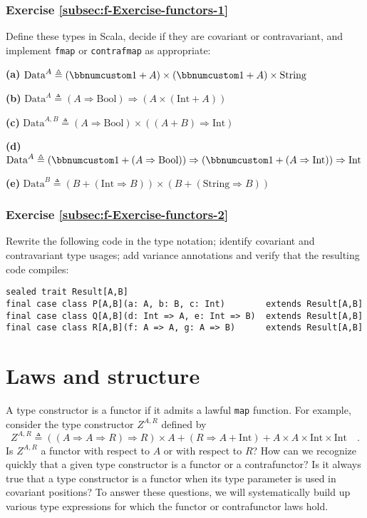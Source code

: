\subsubsection{Exercise \label{subsec:f-Exercise-functors-1}\ref{subsec:f-Exercise-functors-1}}

Define these types in Scala, decide if they are covariant or contravariant,
and implement \lstinline!fmap! or \lstinline!contrafmap! as appropriate:

\textbf{(a)} $\text{Data}^{A}\triangleq\left(\bbnum 1+A\right)\times\left(\bbnum 1+A\right)\times\text{String}$

\textbf{(b)} $\text{Data}^{A}\triangleq(A\Rightarrow\text{Bool})\Rightarrow\left(A\times\left(\text{Int}+A\right)\right)$

\textbf{(c)} $\text{Data}^{A,B}\triangleq(A\Rightarrow\text{Bool})\times\left((A+B)\Rightarrow\text{Int}\right)$

\textbf{(d)} $\text{Data}^{A}\triangleq(\bbnum 1+(A\Rightarrow\text{Bool}))\Rightarrow(\bbnum 1+(A\Rightarrow\text{Int}))\Rightarrow\text{Int}$

\textbf{(e)} $\text{Data}^{B}\triangleq(B+(\text{Int}\Rightarrow B))\times(B+(\text{String}\Rightarrow B))$

\subsubsection{Exercise \label{subsec:f-Exercise-functors-2}\ref{subsec:f-Exercise-functors-2}}

Rewrite the following code in the type notation; identify covariant
and contravariant type usages; add variance annotations and verify
that the resulting code compiles:

\begin{lstlisting}
sealed trait Result[A,B]
final case class P[A,B](a: A, b: B, c: Int)        extends Result[A,B]
final case class Q[A,B](d: Int => A, e: Int => B)  extends Result[A,B]
final case class R[A,B](f: A => A, g: A => B)      extends Result[A,B]
\end{lstlisting}


\section{Laws and structure\label{sec:f-Laws-and-structure}}

A type constructor is a functor if it admits a lawful \lstinline!map!
function. For example, consider the type constructor $Z^{A,R}$ defined
by 
\[
Z^{A,R}\triangleq\left(\left(A\Rightarrow A\Rightarrow R\right)\Rightarrow R\right)\times A+\left(R\Rightarrow A+\text{Int}\right)+A\times A\times\text{Int}\times\text{Int}\quad.
\]
Is $Z^{A,R}$ a functor with respect to $A$ or with respect to $R$?
How can we recognize quickly that a given type constructor is a functor
or a contrafunctor? Is it always true that a type constructor is a
functor when its type parameter is used in covariant positions? To
answer these questions, we will systematically build up various type
expressions for which the functor or contrafunctor laws hold. 

